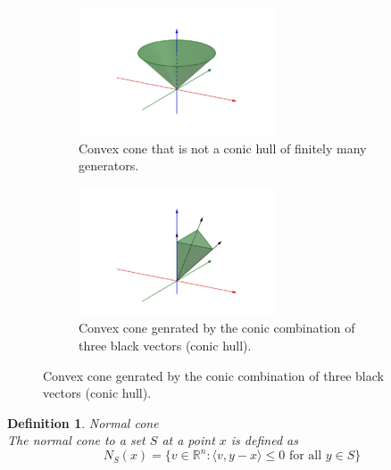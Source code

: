 \documentclass[11pt]{book} %
\newtheorem{definition}{Definition}[section]
\begin{document}
\begin{figure}[H]
    \begin{subfigure}{0.5\textwidth}
        \centering
        \includegraphics[width=\linewidth]{Figs/circular-pyramid.png}
        \caption{Convex cone that is not a conic hull of finitely many generators.}
    \end{subfigure}
    \begin{subfigure}{0.5\textwidth}
        \centering
        \includegraphics[width=\linewidth]{Figs/polyhedral_cone.png}
        \caption{Convex cone genrated by the conic combination of three black vectors (conic hull).}
    \end{subfigure}
\end{figure}

\begin{definition}{Normal cone} \\
The normal cone to a set $S$ at a point $x$ is defined as
\begin{equation}
    N_S(x) = \{ v \in \mathbb{R}^n : \langle v, y-x \rangle \leq 0 \text{ for all } y \in S \}
\end{equation}
\end{definition}
\end{document}
